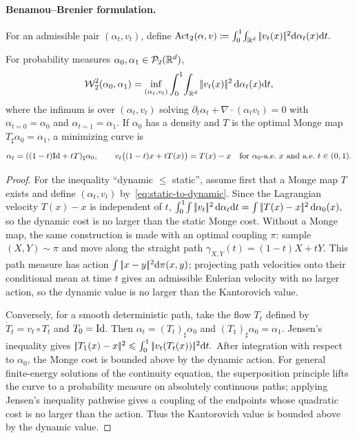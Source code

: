 \paragraph{Benamou--Brenier formulation.}
\begin{defn}\label{def-benamou-brenier-action}
For an admissible pair $(\alpha_t,v_t)$, define
\(\operatorname{Act}_2(\alpha,v) \coloneqq \int_0^1\!\int_{\mathbb{R}^d}|\!| v_t(x) |\!|^2\mathrm{d}\alpha_t(x)\mathrm{d} t.\)
\end{defn}
\begin{thm}\label{thm-benamou-brenier}
For probability measures $\alpha_0,\alpha_1\in\mathcal{P}_2(\mathbb{R}^d)$,
\begin{equation}\label{eq:benamou-brenier}
\operatorname{\mathcal{W}}_2^2(\alpha_0,\alpha_1)
=
\inf_{(\alpha_t,v_t)}
\int_0^1\!\int_{\mathbb{R}^d}|\!| v_t(x) |\!|^2\,\mathrm{d}\alpha_t(x)\mathrm{d} t,
\end{equation}
where the infimum is over $(\alpha_t,v_t)$ solving $\partial_t\alpha_t+\nabla\!\cdot(\alpha_t v_t)=0$ with $\alpha_{t=0}=\alpha_0$ and $\alpha_{t=1}=\alpha_1$. If $\alpha_0$ has a density and $T$ is the optimal Monge map $T_\sharp\alpha_0=\alpha_1$, a minimizing curve is
\begin{equation}\label{eq:static-to-dynamic}
\alpha_t=((1-t)\mathrm{Id}+tT)_\sharp\alpha_0,
\qquad
v_t\big((1-t)x+tT(x)\big)=T(x)-x
\quad\text{for $\alpha_0$-a.e.\ $x$ and a.e.\ $t\in(0,1)$}.
\end{equation}
\end{thm}
\begin{proof}
For the inequality ``dynamic $\leq$ static'', assume first that a Monge map $T$ exists and define $(\alpha_t,v_t)$ by~\eqref{eq:static-to-dynamic}. Since the Lagrangian velocity $T(x)-x$ is independent of $t$,
\(\int_0^1\!\int|\!| v_t |\!|^2\,\mathrm{d}\alpha_t\mathrm{d} t = \int|\!| T(x)-x |\!|^2\,\mathrm{d}\alpha_0(x),\)
so the dynamic cost is no larger than the static Monge cost. Without a Monge map, the same construction is made with an optimal coupling $\pi$: sample $(X,Y)\sim\pi$ and move along the straight path $\gamma_{X,Y}(t)=(1-t)X+tY$. This path measure has action $\int|\!| x-y |\!|^2\mathrm{d}\pi(x,y)$; projecting path velocities onto their conditional mean at time $t$ gives an admissible Eulerian velocity with no larger action, so the dynamic value is no larger than the Kantorovich value.

Conversely, for a smooth deterministic path, take the flow $T_t$ defined by $\dot T_t=v_t\circ T_t$ and $T_0=\mathrm{Id}$. Then $\alpha_t=(T_t)_\sharp\alpha_0$ and $(T_1)_\sharp\alpha_0=\alpha_1$. Jensen's inequality gives
\(|\!| T_1(x)-x |\!|^2 \leqslant \int_0^1|\!| v_t(T_t(x)) |\!|^2\mathrm{d} t.\)
After integration with respect to $\alpha_0$, the Monge cost is bounded above by the dynamic action. For general finite-energy solutions of the continuity equation, the superposition principle lifts the curve to a probability measure on absolutely continuous paths; applying Jensen's inequality pathwise gives a coupling of the endpoints whose quadratic cost is no larger than the action. Thus the Kantorovich value is bounded above by the dynamic value.
\end{proof}
